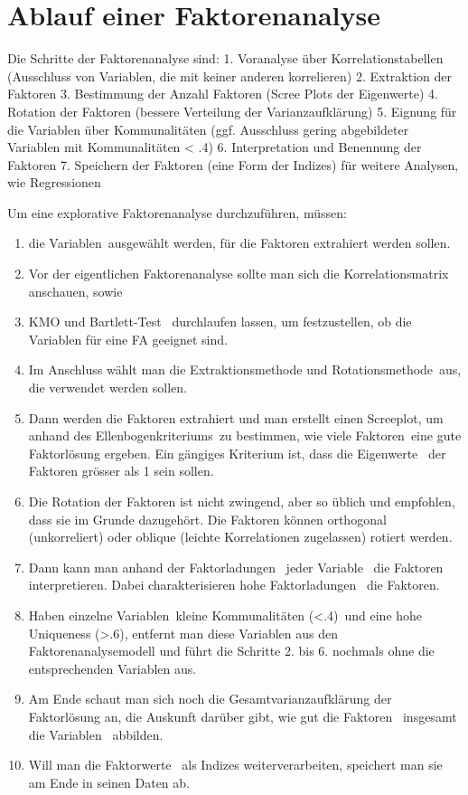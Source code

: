 \documentclass[
  10pt,
  letterpaper,
  a4paper, twoside]{scrreprt}
\providecommand{\tightlist}{%
  \setlength{\itemsep}{0pt}\setlength{\parskip}{0pt}}\usepackage{longtable,booktabs,array}
\begin{document}
\section{Ablauf einer
Faktorenanalyse}\label{ablauf-einer-faktorenanalyse}

Die Schritte der Faktorenanalyse sind: 1. Voranalyse über
Korrelationstabellen (Ausschluss von Variablen, die mit keiner anderen
korrelieren) 2. Extraktion der Faktoren 3. Bestimmung der Anzahl
Faktoren (Scree Plots der Eigenwerte) 4. Rotation der Faktoren (bessere
Verteilung der Varianzaufklärung) 5. Eignung für die Variablen über
Kommunalitäten (ggf. Ausschluss gering abgebildeter Variablen mit
Kommunalitäten \textless{} .4) 6. Interpretation und Benennung der
Faktoren 7. Speichern der Faktoren (eine Form der Indizes) für weitere
Analysen, wie Regressionen

Um eine explorative Faktorenanalyse durchzuführen, müssen:

\begin{enumerate}
\def\labelenumi{\arabic{enumi}.}
\tightlist
\item
  die Variablen~ausgewählt werden, für die Faktoren extrahiert werden
  sollen.
\item
  Vor der eigentlichen Faktorenanalyse sollte man sich die
  Korrelationsmatrix~ anschauen, sowie
\item
  KMO und Bartlett-Test~ durchlaufen lassen, um festzustellen, ob die
  Variablen für eine FA geeignet sind.
\item
  Im Anschluss wählt man die Extraktionsmethode und
  Rotationsmethode~aus, die verwendet werden sollen.
\item
  Dann werden die Faktoren extrahiert und man erstellt einen Screeplot,
  um anhand des Ellenbogenkriteriums~zu bestimmen, wie viele
  Faktoren~eine gute Faktorlösung ergeben. Ein gängiges Kriterium ist,
  dass die Eigenwerte~ der Faktoren grösser als 1 sein sollen.
\item
  Die Rotation der Faktoren ist nicht zwingend, aber so üblich und
  empfohlen, dass sie im Grunde dazugehört. Die Faktoren können
  orthogonal (unkorreliert) oder oblique (leichte Korrelationen
  zugelassen) rotiert werden.
\item
  Dann kann man anhand der Faktorladungen~ jeder Variable~ die Faktoren
  interpretieren. Dabei charakterisieren hohe Faktorladungen~ die
  Faktoren.
\item
  Haben einzelne Variablen~kleine Kommunalitäten (\textless.4)~und eine
  hohe Uniqueness (\textgreater.6), entfernt man diese Variablen aus den
  Faktorenanalysemodell und führt die Schritte 2. bis 6. nochmals ohne
  die entsprechenden Variablen aus.
\item
  Am Ende schaut man sich noch die Gesamtvarianzaufklärung der
  Faktorlösung an, die Auskunft darüber gibt, wie gut die Faktoren~
  insgesamt die Variablen~ abbilden.
\item
  Will man die Faktorwerte~ als Indizes weiterverarbeiten, speichert man
  sie am Ende in seinen Daten ab.
\end{enumerate}
\end{document}
